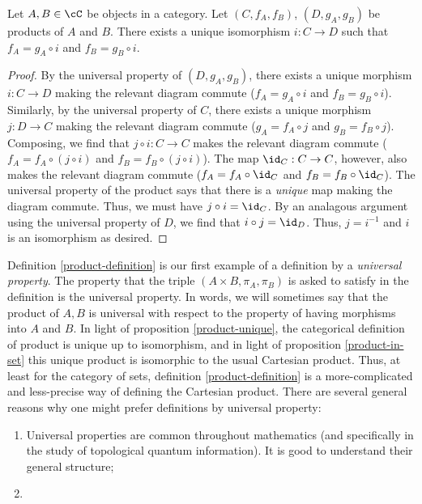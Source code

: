 \begin{prop}\label{product-unique} Let $A,B\in\cC$ be objects in a category. Let $(C,f_A,f_B)$, $(D,g_A,g_B)$ be products of $A$ and $B$. There exists a unique isomorphism $i:C\to D$ such that $f_A= g_A\circ i$ and $f_B=g_B\circ i$.
\end{prop}
\begin{proof} By the universal property of $(D,g_A,g_B)$, there exists a unique morphism $i:C\to D$ making the relevant diagram commute ($f_A= g_A\circ i$ and $f_B=g_B\circ i$). Similarly, by the universal property of $C$, there exists a unique morphism $j:D\to C$ making the relevant diagram commute ($g_A= f_A\circ j$ and $g_B=f_B\circ j$). Composing, we find that $j\circ i:C\to C$ makes the relevant diagram commute ($f_A=f_A\circ (j\circ i)$ and $f_B=f_B\circ (j\circ i)$). The map $\id_C:C\to C$, however, also makes the relevant diagram commute ($f_A=f_A\circ \id_C$ and $f_B=f_B\circ \id_C$). The universal property of the product says that there is a {\em unique} map making the diagram commute. Thus, we must have $j\circ i =\id_C$. By an analagous argument using the universal property of $D$, we find that $i\circ j=\id_D$. Thus, $j=i^{-1}$ and $i$ is an isomorphism as desired.
\end{proof}

\begin{rem} Definition \ref{product-definition} is our first example of a definition by a {\em universal property}. The property that the triple $(A\times B,\pi_A,\pi_B)$ is asked to satisfy in the definition is the universal property. In words, we will sometimes say that the product of $A,B$ is universal with respect to the property of having morphisms into $A$ and $B$. In light of proposition \ref{product-unique}, the categorical definition of product is unique up to isomorphism, and in light of proposition \ref{product-in-set} this unique product is isomorphic to the usual Cartesian product. Thus, at least for the category of sets, definition \ref{product-definition} is a more-complicated and less-precise way of defining the Cartesian product. There are several general reasons why one might prefer definitions by universal property:

\begin{enumerate}
\item Universal properties are common throughout mathematics (and specifically in the study of topological quantum information). It is good to understand their general structure;
\item {}
\end{enumerate}
\end{rem}

